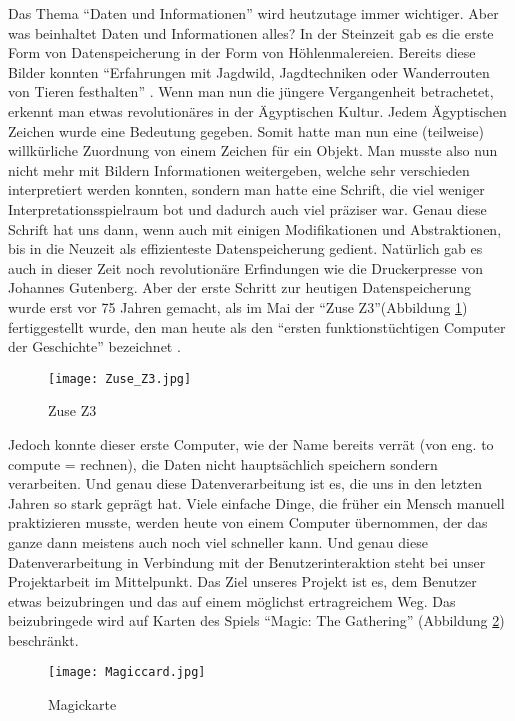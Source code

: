 Das Thema "`Daten und Informationen"' wird heutzutage immer wichtiger. Aber was beinhaltet Daten und Informationen alles? In der Steinzeit gab es die erste Form von Datenspeicherung in der Form von Höhlenmalereien. Bereits diese Bilder konnten "`Erfahrungen  mit Jagdwild, Jagdtechniken oder Wanderrouten von Tieren festhalten"' \cite{Hoehlenmalerei}. Wenn man nun die jüngere Vergangenheit betrachetet, erkennt man etwas revolutionäres in der Ägyptischen Kultur. Jedem Ägyptischen Zeichen wurde eine Bedeutung gegeben. Somit hatte man nun eine (teilweise) willkürliche Zuordnung von einem Zeichen für ein Objekt. Man musste also nun nicht mehr mit Bildern Informationen weitergeben, welche sehr verschieden interpretiert werden konnten, sondern man hatte eine Schrift, die viel weniger Interpretationsspielraum bot und dadurch auch viel präziser war. Genau diese Schrift hat uns dann, wenn auch mit einigen Modifikationen und Abstraktionen, bis in die Neuzeit als effizienteste Datenspeicherung gedient. Natürlich gab es auch in dieser Zeit noch revolutionäre Erfindungen wie die Druckerpresse von Johannes Gutenberg. Aber der erste Schritt zur heutigen Datenspeicherung wurde erst vor 75 Jahren gemacht, als im Mai der "`Zuse Z3"'(Abbildung \ref{fig:Zuse_Z3}) fertiggestellt wurde, den man heute als den "`ersten funktionstüchtigen Computer der Geschichte"' bezeichnet \cite{Computer}. 
\begin{figure}[htbp] 
  \centering
     \texttt{[image: Zuse\_Z3.jpg]}
  \caption{Zuse Z3 \cite{Zuse_Z3}}
  \label{fig:Zuse_Z3}
\end{figure}
Jedoch konnte dieser erste Computer, wie der Name bereits verrät (von eng. to compute = rechnen), die Daten nicht hauptsächlich speichern sondern verarbeiten. Und genau diese Datenverarbeitung ist es, die uns in den letzten Jahren so stark geprägt hat. Viele einfache Dinge, die früher ein Mensch manuell praktizieren musste, werden heute von einem Computer übernommen, der das ganze dann meistens auch noch viel schneller kann. Und genau diese Datenverarbeitung in Verbindung mit der Benutzerinteraktion steht bei unser Projektarbeit im Mittelpunkt. Das Ziel unseres Projekt ist es, dem Benutzer etwas beizubringen und das auf einem möglichst ertragreichem Weg. Das beizubringede wird auf Karten des Spiels "`Magic: The Gathering"' (Abbildung \ref{fig:Magiccard}) beschränkt.
\begin{figure}[htbp] 
  \centering
     \texttt{[image: Magiccard.jpg]}
  \caption{Magickarte \cite{Magiccard}}
  \label{fig:Magiccard}
\end{figure}
